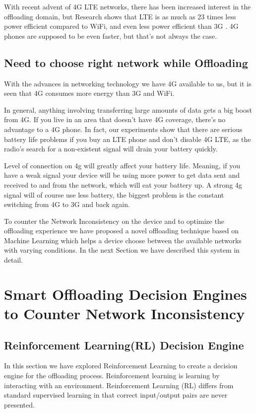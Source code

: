 \documentclass[12pt, twocolumn]{report}
\begin{document}
With recent advent of 4G LTE networks, there has been increased interest in the offloading domain, but Research shows that LTE is as much as 23 times less power efficient compared to WiFi, and even less power efficient than 3G \cite{huang2012close}.
4G phones are supposed to be even faster, but that's not always the case.

\section{Need to choose right network while Offloading}
With the advances in networking technology we have 4G available to us, but it is seen that 4G consumes more energy than 3G and WiFi.

In general, anything involving transferring large amounts of data gets a big boost from 4G. If you live in an area that doesn't have 4G coverage, there's no advantage to a 4G phone. In fact, our experiments show that there are serious battery life problems if you buy an LTE phone and don't disable 4G LTE, as the radio's search for a non-existent signal will drain your battery quickly.

Level of connection on 4g will greatly affect your battery life. Meaning, if you have a weak signal your device will be using more power to get data sent and received to and from the network, which will eat your battery up. A strong 4g signal will of course use less battery, the biggest problem is the constant switching from 4G to 3G and back again.


To counter the Network Inconsistency on the device and to optimize the offloading experience we have proposed a novel offloading technique based on Machine Learning which helps a device choose between the available networks with varying conditions. In the next Section we have described this system in detail.

\chapter{Smart Offloading Decision Engines to Counter Network Inconsistency}

\section{Reinforcement Learning(RL) Decision Engine}
In this section we have explored Reinforcement Learning to create a decision engine for the offloading
process. Reinforcement learning is learning by interacting with an environment. Reinforcement Learning
(RL) differs from standard supervised learning in that correct input/output pairs are never presented.
\end{document}
